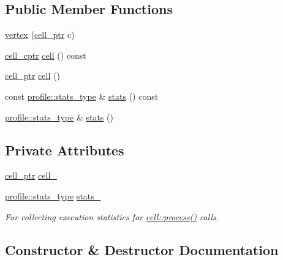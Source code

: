 \subsection*{Public Member Functions}
\begin{DoxyCompactItemize}
\item 
\hyperlink{classecto_1_1graph_1_1vertex_a18cea5500866c9d86ce252e84d3881c6}{vertex} (\hyperlink{namespaceecto_aed1809e82b9229ea81ef9ee3438cf62c}{cell\+\_\+ptr} c)
\item 
\hyperlink{namespaceecto_ab708c826226c91fd6f3c8c121f293a78}{cell\+\_\+cptr} \hyperlink{classecto_1_1graph_1_1vertex_aa5876238d51eb82bed7a17414bd74132}{cell} () const 
\item 
\hyperlink{namespaceecto_aed1809e82b9229ea81ef9ee3438cf62c}{cell\+\_\+ptr} \hyperlink{classecto_1_1graph_1_1vertex_a7b2bed5e1305cc26855c5bc8bc6884df}{cell} ()
\item 
const \hyperlink{structecto_1_1profile_1_1stats__type}{profile\+::stats\+\_\+type} \& \hyperlink{classecto_1_1graph_1_1vertex_a38bfe554aa3f8413769be22dff0ea2c3}{stats} () const 
\item 
\hyperlink{structecto_1_1profile_1_1stats__type}{profile\+::stats\+\_\+type} \& \hyperlink{classecto_1_1graph_1_1vertex_a522f60e25aa0d769b3826911e0c69d6f}{stats} ()
\end{DoxyCompactItemize}
\subsection*{Private Attributes}
\begin{DoxyCompactItemize}
\item 
\hyperlink{namespaceecto_aed1809e82b9229ea81ef9ee3438cf62c}{cell\+\_\+ptr} \hyperlink{classecto_1_1graph_1_1vertex_a14485eadc4288f5d4e5e32e6b5218ec7}{cell\+\_\+}
\item 
\hyperlink{structecto_1_1profile_1_1stats__type}{profile\+::stats\+\_\+type} \hyperlink{classecto_1_1graph_1_1vertex_abf79016904200297ba32e42534c8ac53}{stats\+\_\+}
\begin{DoxyCompactList}\small\item\em For collecting execution statistics for \hyperlink{structecto_1_1cell_a6b810671ee21f5dddbc1206abfb999f3}{cell\+::process()} calls. \end{DoxyCompactList}\end{DoxyCompactItemize}


\subsection{Constructor \& Destructor Documentation}
\hypertarget{classecto_1_1graph_1_1vertex_a18cea5500866c9d86ce252e84d3881c6}{}
